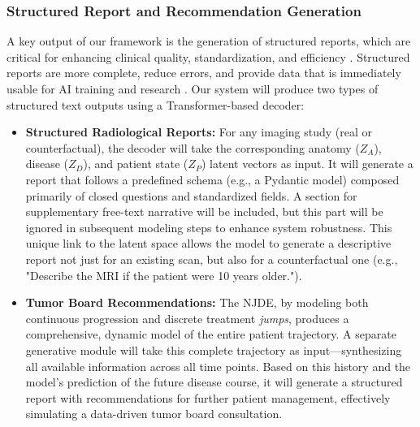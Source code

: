 \documentclass[11pt, a4paper]{article}
\begin{document}
\subsubsection{Structured Report and Recommendation Generation}
A key output of our framework is the generation of structured reports, which are critical for enhancing clinical quality, standardization, and efficiency \cite{JorgHalfmann2023}. Structured reports are more complete, reduce errors, and provide data that is immediately usable for AI training and research \cite{SacoranskyKwan2024}. Our system will produce two types of structured text outputs using a Transformer-based decoder:
\begin{itemize}
    \item \textbf{Structured Radiological Reports:} For any imaging study (real or counterfactual), the decoder will take the corresponding anatomy ($Z_A$), disease ($Z_D$), and patient state ($Z_P$) latent vectors as input. It will generate a report that follows a predefined schema (e.g., a Pydantic model) composed primarily of closed questions and standardized fields. A section for supplementary free-text narrative will be included, but this part will be ignored in subsequent modeling steps to enhance system robustness. This unique link to the latent space allows the model to generate a descriptive report not just for an existing scan, but also for a counterfactual one (e.g., "Describe the MRI if the patient were 10 years older.").
    \item \textbf{Tumor Board Recommendations:} The NJDE, by modeling both continuous progression and discrete treatment \textit{jumps}, produces a comprehensive, dynamic model of the entire patient trajectory. A separate generative module will take this complete trajectory as input—synthesizing all available information across all time points. Based on this history and the model's prediction of the future disease course, it will generate a structured report with recommendations for further patient management, effectively simulating a data-driven tumor board consultation.
\end{itemize}
\end{document}
